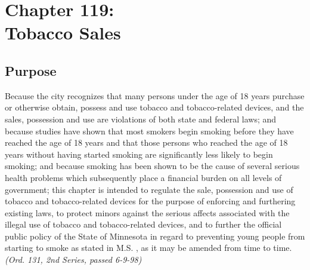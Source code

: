 \chapter*{Chapter 119: \\
	Tobacco Sales}
    \minitoc
    \pagebreak

\section{Purpose}
Because the city recognizes that many persons under the age of 18 years purchase or otherwise obtain, possess and use tobacco and tobacco-related devices, and the sales, possession and use are violations of both state and federal laws; and because studies have shown that most smokers begin smoking before they have reached the age of 18 years and that those persons who reached the age of 18 years without having started smoking are significantly less likely to begin smoking; and because smoking has been shown to be the cause of several serious health problems which subsequently place a financial burden on all levels of government; this chapter is intended to regulate the sale, possession and use of tobacco and tobacco-related devices for the purpose of enforcing and furthering existing laws, to protect minors against the serious affects associated with the illegal use of tobacco and tobacco-related devices, and to further the official public policy of the State of Minnesota in regard to preventing young people from starting to smoke as stated in M.S. , as it may be amended from time to time.\\
\emph{(Ord. 131, 2nd Series, passed 6-9-98)}
